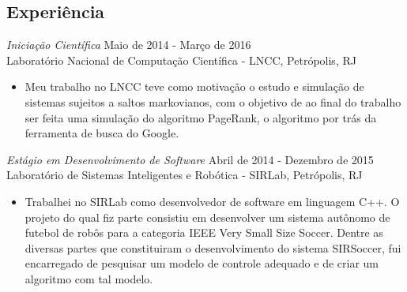 \documentclass[margin, 10pt]{res} %
\begin{document}
\begin{resume}

 

 
\section{Experiência}
{\sl Iniciação Científica} \hfill Maio de 2014 - Março de 2016\\
Laboratório Nacional de Computação Científica - LNCC, Petrópolis, RJ 
\begin{itemize} \itemsep -2pt %
\item Meu trabalho no LNCC teve como motivação o estudo e simulação de sistemas sujeitos a saltos markovianos, com o objetivo de ao final do trabalho ser feita uma simulação do algoritmo PageRank, o algoritmo por trás da ferramenta de busca do Google.
\end{itemize}

{\sl Estágio em Desenvolvimento de Software} \hfill Abril de 2014 - Dezembro de 2015\\
Laboratório de Sistemas Inteligentes e Robótica - SIRLab, Petrópolis, RJ 
\begin{itemize} \itemsep -2pt %
\item Trabalhei no SIRLab como desenvolvedor de software em linguagem C++. O projeto do qual fiz parte consistiu em desenvolver um sistema autônomo de futebol de robôs para a categoria IEEE Very Small Size Soccer. Dentre as diversas partes que constituiram o desenvolvimento do sistema SIRSoccer, fui encarregado de pesquisar um modelo de controle adequado e de criar um algoritmo com tal modelo.
\end{itemize}



\end{resume}
\end{document}
